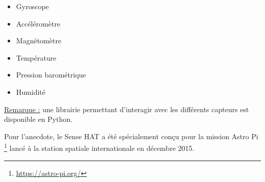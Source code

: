 \begin{itemize}
\item Gyroscope
\item Accéléromètre
\item Magnétomètre
\item Température
\item Pression barométrique
\item Humidité
\end{itemize}

\underline{Remarque :} une librairie permettant
d'interagir avec les différents capteurs est disponible en Python.

Pour l'anecdote, le Sense HAT a été spécialement conçu pour la mission Astro Pi
\footnote{\url{https://astro-pi.org/}} lancé à la station spatiale
internationale en décembre 2015.

